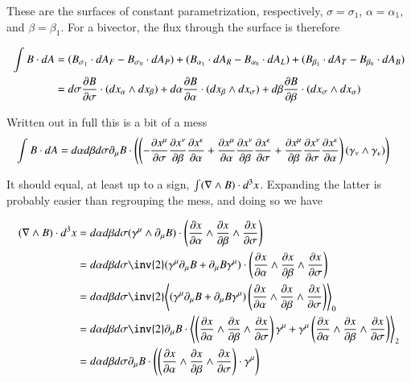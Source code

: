 These are the surfaces of constant parametrization, respectively, $\sigma = \sigma_1$, $\alpha = \alpha_1$, and $\beta = \beta_1$.  For a bivector, the flux through the surface is therefore

\begin{align*}
\int B \cdot dA 
&=
(B_{\sigma_1} \cdot dA_F - B_{\sigma_0} \cdot dA_P )
+ (B_{\alpha_1} \cdot dA_R - B_{\alpha_0} \cdot dA_L)
+ (B_{\beta_1} \cdot dA_T - B_{\beta_0} \cdot dA_B) \\
&=
d \sigma \frac{\partial {B}}{\partial {\sigma}} \cdot (dx_\alpha \wedge dx_\beta )
+ d \alpha \frac{\partial {B}}{\partial {\alpha}} \cdot (dx_\beta \wedge dx_\sigma) 
+ d \beta \frac{\partial {B}}{\partial {\beta}} \cdot (dx_\sigma \wedge dx_\alpha ) \\
\end{align*}

Written out in full this is a bit of a mess
\begin{align}\label{eqn:mess}
\int B \cdot dA 
&=
d \alpha d\beta d\sigma 
\partial_\mu B \cdot
\left(
\left(
- \frac{\partial {x^\mu}}{\partial {\sigma}} \frac{\partial {x^\nu}}{\partial {\beta}} \frac{\partial {x^\epsilon}}{\partial {\alpha}} 
+ \frac{\partial {x^\mu}}{\partial {\alpha}} \frac{\partial {x^\nu}}{\partial {\beta}} \frac{\partial {x^\epsilon}}{\partial {\sigma}} 
+ \frac{\partial {x^\mu}}{\partial {\beta}} \frac{\partial {x^\nu}}{\partial {\sigma}} \frac{\partial {x^\epsilon}}{\partial {\alpha}} 
\right) 
(\gamma_\nu \wedge \gamma_\epsilon )
\right) 
\end{align}

It should equal, at least up to a sign, $\int (\nabla \wedge B) \cdot d^3 x$.  Expanding the latter is probably easier than regrouping the mess, and doing so we have

\begin{align*}
(\grad \wedge B) \cdot d^3 x
&=
d\alpha d\beta d\sigma ( \gamma^\mu \wedge \partial_\mu B)  \cdot \left( \PD{\alpha}{x} \wedge \PD{\beta}{x} \wedge \PD{\sigma}{x} \right) \\
&= 
d\alpha d\beta d\sigma \inv{2} ( \gamma^\mu \partial_\mu B + \partial_\mu B \gamma^\mu )  \cdot \left( \PD{\alpha}{x} \wedge \PD{\beta}{x} \wedge \PD{\sigma}{x} \right) \\
&=
d\alpha d\beta d\sigma \inv{2} \gpgradezero{
( \gamma^\mu \partial_\mu B + \partial_\mu B \gamma^\mu )  \left( \PD{\alpha}{x} \wedge \PD{\beta}{x} \wedge \PD{\sigma}{x} \right) }
\\
&=
d\alpha d\beta d\sigma \inv{2} 
\partial_\mu B \cdot
\gpgradetwo{
\left( \PD{\alpha}{x} \wedge \PD{\beta}{x} \wedge \PD{\sigma}{x} \right) \gamma^\mu 
+ \gamma^\mu \left( \PD{\alpha}{x} \wedge \PD{\beta}{x} \wedge \PD{\sigma}{x} \right) }
\\
&=
d\alpha d\beta d\sigma 
\partial_\mu B \cdot
\left( \left( \PD{\alpha}{x} \wedge \PD{\beta}{x} \wedge \PD{\sigma}{x} \right) \cdot \gamma^\mu \right)
\\
\end{align*}

